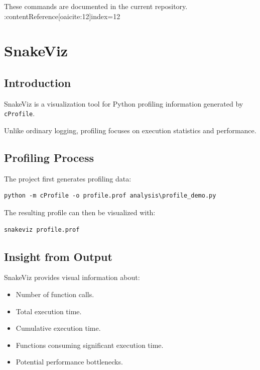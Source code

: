 \documentclass[12pt,a4paper]{report}
\begin{document}
These commands are documented in the current repository. :contentReference[oaicite:12]{index=12}


\chapter{SnakeViz}

\section{Introduction}

SnakeViz is a visualization tool for Python profiling information
generated by \texttt{cProfile}.

Unlike ordinary logging, profiling focuses on execution statistics and
performance.

\section{Profiling Process}

The project first generates profiling data:

\begin{lstlisting}
python -m cProfile -o profile.prof analysis\profile_demo.py
\end{lstlisting}

The resulting profile can then be visualized with:

\begin{lstlisting}
snakeviz profile.prof
\end{lstlisting}

\section{Insight from Output}

SnakeViz provides visual information about:

\begin{itemize}
    \item Number of function calls.
    \item Total execution time.
    \item Cumulative execution time.
    \item Functions consuming significant execution time.
    \item Potential performance bottlenecks.
\end{itemize}
\end{document}
